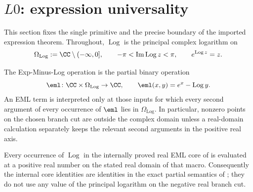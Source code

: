 \section{\texorpdfstring{\(L0\)}{L0}: expression universality}\label{sec:L0}

This section fixes the single primitive and the precise boundary of the imported
expression theorem.  Throughout, \(\operatorname{Log}\) is the principal complex
logarithm on
\[
  \Omega_{\mathrm{Log}}:=\CC\setminus(-\infty,0],
  \qquad -\pi<\operatorname{Im}\operatorname{Log}z<\pi,
  \qquad e^{\operatorname{Log}z}=z .
\]

\begin{definition}\label{def:eml}
The Exp-Minus-Log operation is the partial binary operation
\[
  \eml\colon\CC\times\Omega_{\mathrm{Log}}\to\CC,
  \qquad \eml(x,y)=e^x-\operatorname{Log}y .
\]
An EML term is interpreted only at those inputs for which every second argument
of every occurrence of \(\eml\) lies in \(\Omega_{\mathrm{Log}}\).  In particular,
nonzero points on the chosen branch cut are outside the complex domain unless a
real-domain calculation separately keeps the relevant second arguments in the
positive real axis.
\end{definition}

\begin{lemma}
\label{lem:internal-core-branch-domain-safety}
Every occurrence of \(\operatorname{Log}\) in the internally proved real EML core
of  is evaluated at a
positive real number on the stated real domain of that macro.  Consequently the
internal core identities are identities in the exact partial semantics of
; they do not use any value of the principal logarithm on the
negative real branch cut.
\end{lemma}

